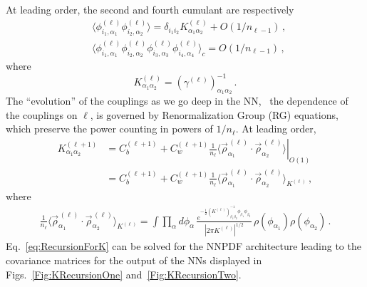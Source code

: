At leading order, the second and fourth cumulant are respectively
\begin{align}
    &\langle \phi^{(\ell)}_{i_1,\alpha_1} \phi^{(\ell)}_{i_2,\alpha_2}\rangle
      = \delta_{i_1 i_2} K^{(\ell)}_{\alpha_1\alpha_2} + O(1/n_{\ell-1})\, , \\
    &\langle \phi^{(\ell)}_{i_1,\alpha_1} \phi^{(\ell)}_{i_2,\alpha_2}
      \phi^{(\ell)}_{i_3,\alpha_3} \phi^{(\ell)}_{i_4,\alpha_4}\rangle_c
      = O(1/n_{\ell-1})\, ,
\end{align}
where
\begin{equation}
    \label{eq:DefineKmat}
    K^{(\ell)}_{\alpha_1\alpha_2} = \left(\gamma^{(\ell)}\right)^{-1}_{\alpha_1\alpha_2}\, .
\end{equation}
The ``evolution'' of the couplings as we go deep in the NN, \ie\ the dependence of the couplings on
$\ell$, is governed by Renormalization Group (RG) equations, which preserve the power counting in
powers of $1/n_{\ell}$. At leading order,
\begin{align}
    K^{(\ell+1)}_{\alpha_1\alpha_2} &=
      \left.
      C_b^{(\ell+1)} + C_w^{(\ell+1)} \frac{1}{n_\ell}
      \langle \vec{\rho}^{\,(\ell)}_{\alpha_1} \cdot
      \vec{\rho}^{\,(\ell)}_{\alpha_2} \rangle
      \right|_{O(1)} \\
      \label{eq:RecursionForK}
      &= C_b^{(\ell+1)} + C_w^{(\ell+1)} \frac{1}{n_\ell}
      \langle \vec{\rho}^{\,(\ell)}_{\alpha_1} \cdot
      \vec{\rho}^{\,(\ell)}_{\alpha_2} \rangle_{K^{(\ell)}}\, ,
\end{align}
where
\begin{align*}
    \frac{1}{n_\ell}
      \langle \vec{\rho}^{\,(\ell)}_{\alpha_1} \cdot
      \vec{\rho}^{\,(\ell)}_{\alpha_2} \rangle_{K^{(\ell)}} =
    \int \prod_{\alpha}d\phi_\alpha\,
      \frac{e^{-\frac12 \left(K^{(\ell)}\right)^{-1}_{\beta_1\beta_2}
        \phi_{\beta_1} \phi_{\beta_2}}}
        {\left|2\pi K^{(\ell)}\right|^{1/2}}\,
        \rho(\phi_{\alpha_1}) \rho(\phi_{\alpha_2})\, .
\end{align*}
Eq.~\eqref{eq:RecursionForK} can be solved for the NNPDF architecture leading to the
covariance matrices for the output of the NNs displayed in
Figs.~\ref{Fig:KRecursionOne} and~\ref{Fig:KRecursionTwo}.
